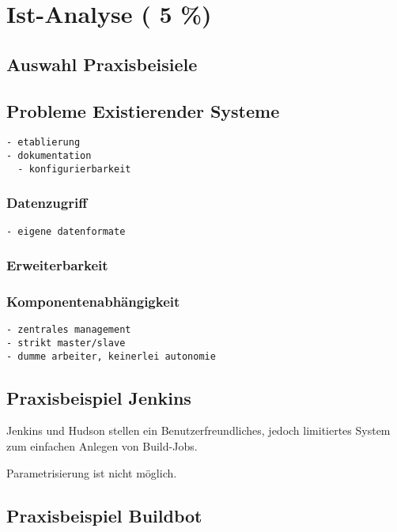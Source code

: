 \chapter{Ist-Analyse ( 5 \%)}
\label{chap:ist-analyse}

\section{Auswahl Praxisbeisiele}

\section{Probleme Existierender Systeme}

\begin{verbatim}
- etablierung
- dokumentation
  - konfigurierbarkeit
\end{verbatim}

\subsection{Datenzugriff}
\begin{verbatim}
- eigene datenformate
\end{verbatim}
\subsection{Erweiterbarkeit}

\subsection{Komponentenabh\"angigkeit}
\begin{verbatim}
- zentrales management
- strikt master/slave
- dumme arbeiter, keinerlei autonomie
\end{verbatim}

\section{Praxisbeispiel Jenkins}

Jenkins und Hudson stellen ein Benutzerfreundliches,
jedoch limitiertes System zum einfachen Anlegen von Build-Jobs.

Parametrisierung ist nicht möglich.

\section{Praxisbeispiel Buildbot}

